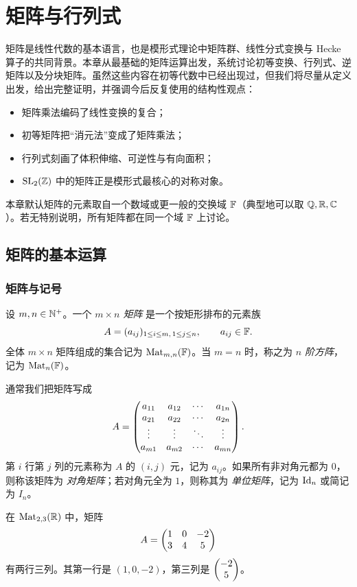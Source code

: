 \chapter{矩阵与行列式}

矩阵是线性代数的基本语言，也是模形式理论中矩阵群、线性分式变换与 Hecke 算子的共同背景。本章从最基础的矩阵运算出发，系统讨论初等变换、行列式、逆矩阵以及分块矩阵。虽然这些内容在初等代数中已经出现过，但我们将尽量从定义出发，给出完整证明，并强调今后反复使用的结构性观点：
\begin{itemize}
  \item 矩阵乘法编码了线性变换的复合；
  \item 初等矩阵把“消元法”变成了矩阵乘法；
  \item 行列式刻画了体积伸缩、可逆性与有向面积；
  \item $\mathrm{SL}_2(\mathbb{Z})$ 中的矩阵正是模形式最核心的对称对象。
\end{itemize}

本章默认矩阵的元素取自一个数域或更一般的交换域 $\mathbb{F}$（典型地可以取 $\mathbb{Q},\mathbb{R},\mathbb{C}$）。若无特别说明，所有矩阵都在同一个域 $\mathbb{F}$ 上讨论。

\section{矩阵的基本运算}

\subsection{矩阵与记号}

\begin{definition}
设 $m,n\in\mathbb{N}^+$。一个 \emph{$m\times n$ 矩阵} 是一个按矩形排布的元素族
\[
A=(a_{ij})_{1\le i\le m,\,1\le j\le n},\qquad a_{ij}\in \mathbb{F}.
\]
全体 $m\times n$ 矩阵组成的集合记为 $\mathrm{Mat}_{m,n}(\mathbb{F})$。当 $m=n$ 时，称之为 \emph{$n$ 阶方阵}，记为 $\mathrm{Mat}_n(\mathbb{F})$。
\end{definition}

通常我们把矩阵写成
\[
A=\begin{pmatrix} a_{11}&a_{12}&\cdots&a_{1n}\\
         a_{21}&a_{22}&\cdots&a_{2n}\\
         \vdots&\vdots&\ddots&\vdots\\
         a_{m1}&a_{m2}&\cdots&a_{mn} \end{pmatrix}.
\]
第 $i$ 行第 $j$ 列的元素称为 $A$ 的 $(i,j)$ 元，记为 $a_{ij}$。如果所有非对角元都为 $0$，则称该矩阵为 \emph{对角矩阵}；若对角元全为 $1$，则称其为 \emph{单位矩阵}，记为 $\mathrm{Id}_n$ 或简记为 $I_n$。

\begin{example}
在 $\mathrm{Mat}_{2,3}(\mathbb{R})$ 中，矩阵
\[
A=\begin{pmatrix} 1&0&-2\\3&4&5 \end{pmatrix}
\]
有两行三列。其第一行是 $(1,0,-2)$，第三列是 $\begin{pmatrix} -2\\5 \end{pmatrix}$。
\end{example}

